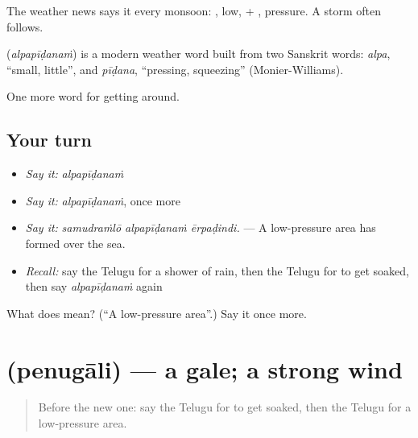 The weather news says it every monsoon: , low, + , pressure. A storm often follows.

\begin{cousinweb}
\textbf{} (\emph{alpapīḍanaṁ}) is a modern weather word built from two Sanskrit words: \emph{alpa}, \textquotedblleft{}small, little\textquotedblright{}, and \emph{pīḍana}, \textquotedblleft{}pressing, squeezing\textquotedblright{} (Monier-Williams).
\end{cousinweb}

\begin{grammarlens}[title={What you've built}]
One more word for getting around.
\end{grammarlens}

\subsection*{Your turn}
\begin{itemize}
\raggedright
  \item \emph{Say it:} \emph{alpapīḍanaṁ}
  \item \emph{Say it:} \emph{alpapīḍanaṁ}, once more
  \item \emph{Say it:} \emph{samudraṁlō alpapīḍanaṁ ērpaḍindi.} — A low-pressure area has formed over the sea.
  \item \emph{Recall:} say the Telugu for a shower of rain, then the Telugu for to get soaked, then say \emph{alpapīḍanaṁ} again
\end{itemize}

\begin{tcolorbox}[breakable,colback=teal!4,colframe=teal!35!black,title={Before you move on}]
What does  mean? (\textquotedblleft{}A low-pressure area\textquotedblright{}.) Say it once more.
\end{tcolorbox}
\section[\texorpdfstring{\te{పెనుగాలి} (penugāli)}{పెనుగాలి (penugāli)}]{ (penugāli) — a gale; a strong wind}

\label{lesson:TE-C478-penugali}



\begin{quote}
Before the new one: say the Telugu for to get soaked, then the Telugu for a low-pressure area.
\end{quote}

